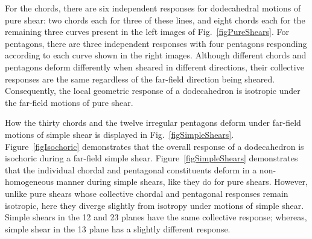 For the chords, there are six independent responses for dodecahedral motions of pure shear: two chords each for three of these lines, and eight chords each for the remaining three curves present in the left images of Fig.~\ref{figPureShears}.  For pentagons, there are three independent responses with four pentagons responding according to each curve shown in the right images.  Although different chords and pentagons deform differently when sheared in different directions, their collective responses are the same regardless of the far-field direction being sheared.  Consequently, the local geometric response of a dodecahedron is isotropic under the far-field motions of pure shear.  

How the thirty chords and the twelve irregular pentagons deform under far-field motions of simple shear is displayed in Fig.~\ref{figSimpleShears}.  Figure~\ref{figIsochoric} demonstrates that the overall response of a dodecahedron is isochoric during a far-field simple shear. Figure~\ref{figSimpleShears} demonstrates that the individual chordal and pentagonal constituents deform in a non-homogeneous manner during simple shears, like they do for pure shears.  However, unlike pure shears whose collective chordal and pentagonal responses remain isotropic, here they diverge slightly from isotropy under motions of simple shear.  Simple shears in the 12 and 23 planes have the same collective response; whereas, simple shear in the 13 plane has a slightly different response.  


